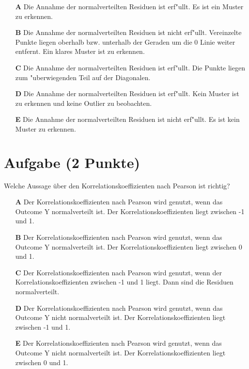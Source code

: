 \documentclass[a4paper, 9pt]{scrartcl}\usepackage[]{graphicx}\usepackage[]{xcolor}
\begin{document}
\begin{enumerate}
\item [\textbf{A} \msquare] Die Annahme der normalverteilten Residuen ist erf{"u}llt. Es ist ein Muster zu erkennen.
\item [\textbf{B} \msquare] Die Annahme der normalverteilten Residuen ist nicht erf{"u}llt. Vereinzelte Punkte liegen oberhalb bzw. unterhalb der Geraden um die 0 Linie weiter entfernt. Ein klares Muster ist zu erkennen.
\item [\textbf{C} \msquare] Die Annahme der normalverteilten Residuen ist erf{"u}llt. Die Punkte liegen zum {"u}berwiegenden Teil auf der Diagonalen.
\item [\textbf{D} \msquare] Die Annahme der normalverteilten Residuen ist erf{"u}llt. Kein Muster ist zu erkennen und keine Outlier zu beobachten.
\item [\textbf{E} \msquare] Die Annahme der normalverteilten Residuen ist nicht erf{"u}llt. Es ist kein Muster zu erkennen.
\end{enumerate}

\section{Aufgabe \hfill (2 Punkte)}




Welche Aussage {\"u}ber den Korrelationskoeffizienten nach Pearson
ist richtig?



\begin{enumerate}
\item [\textbf{A} \msquare] Der Korrelationskoeffizienten nach Pearson wird genutzt, wenn das Outcome Y normalverteilt ist. Der Korrelationskoeffizienten liegt zwischen -1 und 1.
\item [\textbf{B} \msquare] Der Korrelationskoeffizienten nach Pearson wird genutzt, wenn das Outcome Y normalverteilt ist. Der Korrelationskoeffizienten liegt zwischen 0 und 1.
\item [\textbf{C} \msquare] Der Korrelationskoeffizienten nach Pearson wird genutzt, wenn der Korrelationskoeffizienten zwischen -1 und 1 liegt. Dann sind die Residuen normalverteilt.
\item [\textbf{D} \msquare] Der Korrelationskoeffizienten nach Pearson wird genutzt, wenn das Outcome Y nicht normalverteilt ist. Der Korrelationskoeffizienten liegt zwischen -1 und 1.
\item [\textbf{E} \msquare] Der Korrelationskoeffizienten nach Pearson wird genutzt, wenn das Outcome Y nicht normalverteilt ist. Der Korrelationskoeffizienten liegt zwischen 0 und 1.
\end{enumerate}
\end{document}
